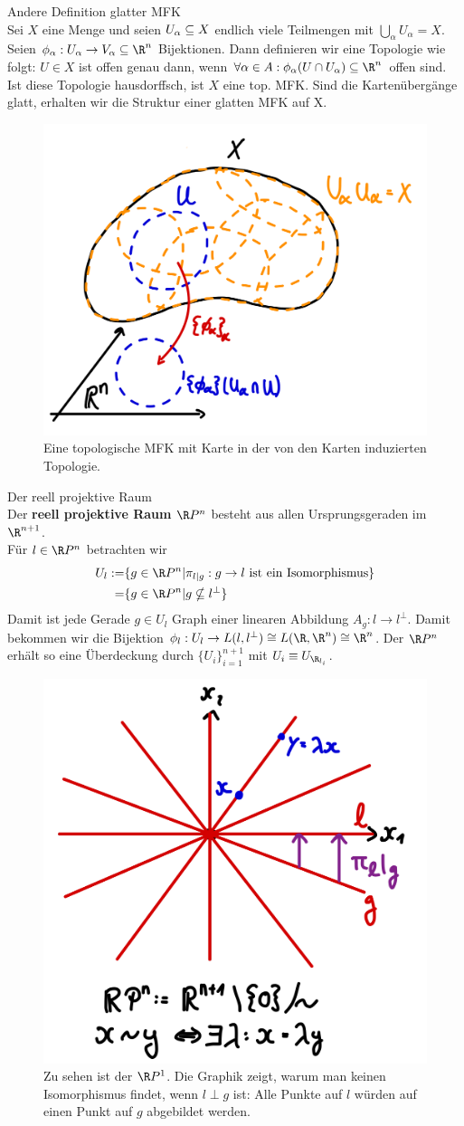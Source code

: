 \begin{bemerkung}Andere Definition glatter MFK \\
Sei $X$ eine Menge und seien $U_\alpha \subseteq X$ endlich viele Teilmengen mit $\bigcup_\alpha U_\alpha = X$. Seien $\phi_\alpha : U_\alpha \to V_\alpha \sub \R^n$ Bijektionen. Dann definieren wir eine Topologie wie folgt: $U \in X$ ist offen genau dann, wenn $\forall \alpha \in A: \phi_\alpha (U \cap U_\alpha) \sub \R^n$ offen sind.\\
Ist diese Topologie hausdorffsch, ist $X$ eine top. MFK. Sind die Kartenübergänge glatt, erhalten wir die Struktur einer glatten MFK auf X.
\begin{figure}[H]
\label{fig:glattetopmfk}
\centering
\includegraphics[width=0.25\linewidth]{Bilder/glattetopmfk.png}
\caption{Eine topologische MFK mit Karte in der von den Karten induzierten Topologie.}
\end{figure}
\end{bemerkung}
\begin{beispiel}Der reell projektive Raum \\
Der \textbf{reell projektive Raum} $\R P^n$ besteht aus allen Ursprungsgeraden im $\R^{n+1}$.\\
Für $l \in \R P^n$ betrachten wir 
\begin{align}
U_l :=& \{ g \in \R P^n | \pi_{l|g}: g \to l \ \text{ist ein Isomorphismus} \}\\
=& \{ g \in \R P^n | g \nsubseteq l^\perp \}
\end{align}
Damit ist jede Gerade $g \in U_l$ Graph einer linearen Abbildung $A_g: l \to l^\perp$. Damit bekommen wir die Bijektion $\phi_l : U_l \to L(l, l^\perp) \cong L(\R, \R^n) \cong \R^n$. Der $\R P^n$ erhält so eine Überdeckung durch $\{U_i\}_{i=1}^{n+1}$ mit $U_i \equiv U_{\R_{l_i}}$.
\begin{figure}[H]
\label{fig:sphere}
\centering
\includegraphics[width=0.25\linewidth]{Bilder/rpn.png}
\caption{Zu sehen ist der $\R P^1$. Die Graphik zeigt, warum man keinen Isomorphismus findet, wenn $l \perp g$ ist: Alle Punkte auf $l$ würden auf einen Punkt auf $g$ abgebildet werden.}
\end{figure}
\end{beispiel}
